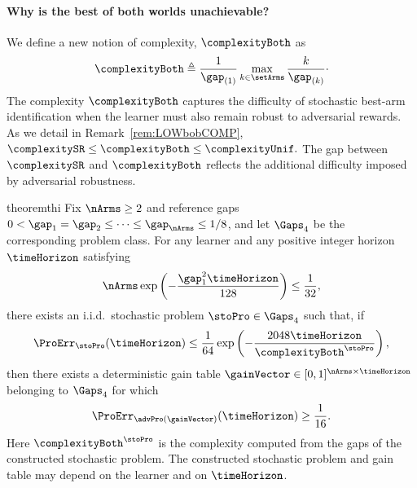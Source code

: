 %
\paragraph{Why is the best of both worlds unachievable?}
% 
We define a new notion of complexity, $\complexityBoth$ as
%
\[
%
\complexityBoth 
\triangleq
\frac{1}{
\gap_{(1)}}
\max_{k\in\setArms}\frac{k}{\gap_{(k)}}\cdot
%
\]
%
The complexity $\complexityBoth$ captures the difficulty of
stochastic best-arm identification when the learner
must also remain robust to adversarial rewards.
As we detail  in Remark~\ref{rem:LOWbobCOMP}, 
$	\complexitySR\leq\complexityBoth\leq\complexityUnif.$
The gap between $\complexitySR$ and $\complexityBoth$ reflects the
additional difficulty imposed by adversarial robustness.
%
\begin{restatable}[\textcolor{titleTh}{Lower bound for the BOB challenge}]{theorem}{thi}\label{th:lowBOB}
Fix $\nArms\geq 2$ and reference gaps
$0<\gap_1=\gap_2\leq\cdots\leq\gap_\nArms\leq 1/8$,
and let $\Gaps_4$ be the corresponding problem class.
For any learner and any positive integer horizon $\timeHorizon$
satisfying
\[
\nArms\exp\left(-\frac{\gap_1^2\timeHorizon}{128}\right)
\leq \frac{1}{32},
\]
there exists an i.i.d.\ stochastic problem $\stoPro\in\Gaps_4$
such that, if
\[
\ProErr_{\stoPro}(\timeHorizon)
\leq \frac{1}{64}\exp\left(
-\frac{2048\timeHorizon}{\complexityBoth^{\stoPro}}
\right),
\]
then there exists a deterministic gain table
$\gainVector\in[0,1]^{\nArms\times\timeHorizon}$
belonging to $\Gaps_4$ for which
\[
\ProErr_{\advPro(\gainVector)}(\timeHorizon)
\geq \frac{1}{16}.
\]
Here $\complexityBoth^{\stoPro}$ is the complexity computed
from the gaps of the constructed stochastic problem.
The constructed stochastic problem and gain table may depend
on the learner and on $\timeHorizon$.
      \end{restatable}    
